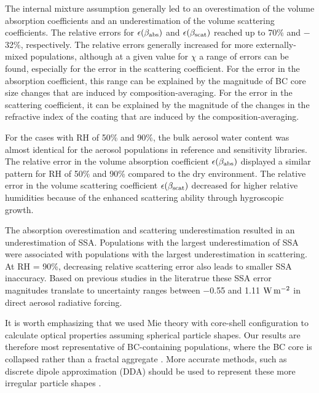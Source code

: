 \documentclass[edeposit,fullpage]{uiucthesis2009}
\makeatletter
\DeclareRobustCommand*\unit[1]
 {\ensuremath{%
   {\thinmuskip3mu\relax
    \def\mu{\text{\textmu}}\def~{\,}%
    \ifx\f@series\testbx\mathbf{#1}\else\mathrm{#1}\fi}}}
\makeatother
\begin{document}
The internal mixture assumption generally led to an overestimation of
the volume absorption coefficients and an underestimation of the
volume scattering coefficients. The relative errors for
$\epsilon(\beta_{\rm abs})$ and $\epsilon(\beta_{\rm scat})$ reached
up to 70\% and $-$32\%, respectively. The relative errors generally
increased for more externally-mixed populations, although at a given
value for $\chi$ a range of errors can be found, especially for the
error in the scattering coefficient. For the error in the absorption
coefficient, this range can be explained by the magnitude of BC core
size changes that are induced by composition-averaging. For the error
in the scattering coefficient, it can be explained by the magnitude of
the changes in the refractive index of the coating that are induced by
the composition-averaging.

For the cases with RH of 50\% and 90\%, the bulk aerosol water content
was almost identical for the aerosol populations in reference and
sensitivity libraries. The relative error in the volume absorption
coefficient $\epsilon(\beta_{\rm abs})$ displayed a similar pattern
for RH of 50\% and 90\% compared to the dry environment. The relative
error in the volume scattering coefficient $\epsilon(\beta_{\rm
  scat})$ decreased for higher relative humidities because of the
enhanced scattering ability through hygroscopic growth.

The absorption overestimation and scattering underestimation resulted
in an underestimation of SSA. Populations with the largest
underestimation of SSA were associated with populations with the
largest underestimation in scattering. At RH = 90\%, decreasing
relative scattering error also leads to smaller SSA inaccuracy. Based
on previous studies in the literatrue these SSA error magnitudes
translate to uncertainty ranges between $-$0.55 and 1.11 \unit{W\,
  m^{-2}} in direct aerosol radiative forcing.
  
It is worth emphasizing that we used Mie theory with core-shell
configuration to calculate optical properties assuming spherical
particle shapes. Our results are therefore most representative of
BC-containing populations, where the BC core is collapsed rather than
a fractal aggregate \citep{china2013morphology,
  china2015morphology}. More accurate methods, such as discrete dipole
approximation (DDA) should be used to represent these more irregular
particle shapes \citep{scarnato2013effects,
  curtis2008laboratory,luo2019optical, wu2020light}.
\end{document}

